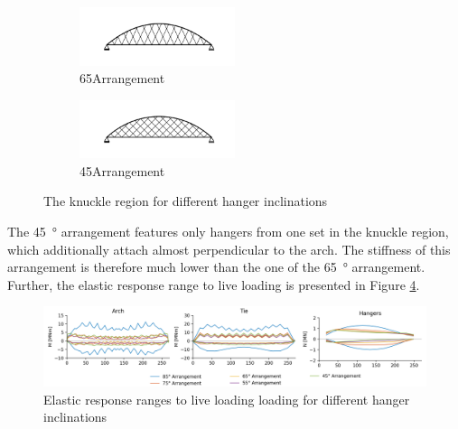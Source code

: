 \begin{figure}[H]
\centering
\begin{subfigure}{0.5\textwidth}
    \centering
    \includegraphics[trim={40 25 189 40},clip, width=0.5\textwidth]{calculations/parallel arrangement comparison/arrangement_65.png}
    \caption{65\degree Arrangement}
    \label{fig:arrangements_65}
\end{subfigure}%
\begin{subfigure}{.5\textwidth}
    \centering
    \includegraphics[trim={40 25 189 40},clip, width=0.5\textwidth]{calculations/parallel arrangement comparison/arrangement_45.png}
    \caption{45\degree Arrangement}
    \label{fig:arrangements_45}
\end{subfigure}
\caption{The knuckle region for different hanger inclinations}
\label{fig:arrangements}
\end{figure}

The \SI{45}{\degree} arrangement features only hangers from one set in the knuckle region, which additionally attach almost perpendicular to the arch. The stiffness of this arrangement is therefore much lower than the one of the \SI{65}{\degree} arrangement. Further, the elastic response range to live loading is presented in Figure \ref{fig:inclination_live}.

\begin{figure}[H]
    \centering
    \includegraphics[trim={1cm 0 13cm 0},clip, width=\textwidth]{calculations/parallel arrangement comparison/live loading_plot.png}
    \caption{Elastic response ranges to live loading loading for different hanger inclinations}
    \label{fig:inclination_live}
\end{figure}


